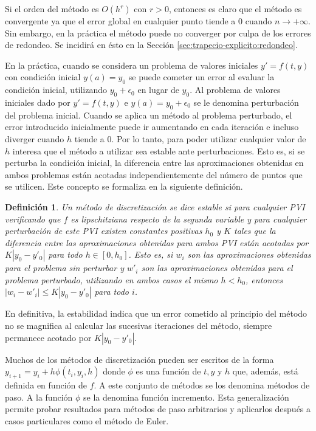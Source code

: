 \documentclass{article}
\theoremstyle{theorem-style}  %
\theoremstyle{definition-style}
\newtheorem{definition}{Definición}[section]
\theoremstyle{example-style}
\begin{document}
	Si el orden del método es $O(h^r)$ con $r > 0$, entonces es claro que el método es convergente ya que el error global en cualquier punto tiende a $0$ cuando $n \rightarrow +\infty$. Sin embargo, en la práctica el método puede no converger por culpa de los errores de redondeo. Se incidirá en ésto en la Sección \ref{sec:trapecio-explicito:redondeo}.
	
	En la práctica, cuando se considera un problema de valores iniciales $y' = f(t, y)$  con condición inicial $y(a) = y_0$ se puede cometer un error al evaluar la condición inicial, utilizando $y_0 + \epsilon_0$ en lugar de $y_0$. Al problema de valores iniciales dado por $y' = f(t, y)$ e $y(a) = y_0 + \epsilon_0$ se le denomina perturbación del problema inicial. Cuando se aplica un método al problema perturbado, el error introducido inicialmente puede ir aumentando en cada iteración e incluso diverger cuando $h$ tiende a $0$. Por lo tanto, para poder utilizar cualquier valor de $h$ interesa que el método a utilizar sea estable ante perturbaciones. Esto es, si se perturba la condición inicial, la diferencia entre las aproximaciones obtenidas en ambos problemas están acotadas independientemente del número de puntos que se utilicen. Este concepto se formaliza en la siguiente definición.

	\begin{definition}
		Un método de discretización se dice estable si para cualquier PVI verificando que $f$ es lipschitziana respecto de la segunda variable y para cualquier perturbación de este PVI existen constantes positivas $h_0$ y $K$ tales que la diferencia entre las aproximaciones obtenidas para ambos PVI están acotadas por $K |y_0 - y'_0|$ para todo $h \in [0,h_0]$. Esto es, si $w_i$ son las aproximaciones obtenidas para el problema sin perturbar y $w'_i$ son las aproximaciones obtenidas para el problema perturbado, utilizando en ambos casos el mismo $h < h_0$, entonces $\left|w_i - w'_i\right| \le K |y_0 - y'_0|$ para todo $i$.
	\end{definition}
	
	En definitiva, la estabilidad indica que un error cometido al principio del método no se magnifica al calcular las sucesivas iteraciones del método, siempre permanece acotado por $K |y_0 - y'_0|$.
	
	Muchos de los métodos de discretización pueden ser escritos de la forma $y_{i+1}=y_i + h \phi(t_i,y_i,h)$ donde $\phi$ es una función de $t, y$ y $h$ que, además, está definida en función de $f$. A este conjunto de métodos se los denomina métodos de paso. A la función $\phi$ se la denomina función incremento. Esta generalización permite probar resultados para métodos de paso arbitrarios y aplicarlos después a casos particulares como el método de Euler.
	
\end{document}
